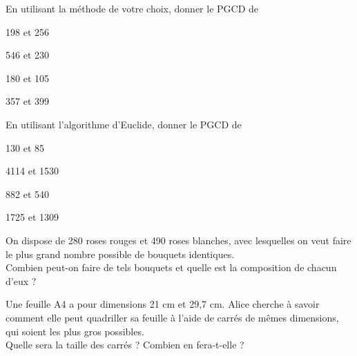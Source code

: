 \begin{exercice}[]
	
	En utilisant la méthode de votre choix, donner le \textsc{PGCD} de
	
	\begin{multicols}{2}
		\begin{enumalph}
			\item 198 et 256
			\item 546 et 230
			\item 180 et 105
			\item 357 et 399
		\end{enumalph}
	\end{multicols}
	
\end{exercice}



\begin{exercice}[]
	En utilisant l'algorithme d'Euclide, donner le \textsc{PGCD} de
	
	\begin{multicols}{2}
		\begin{enumalph}
			\item 130 et 85
			\item 4114 et 1530
			\item 882 et 540
			\item 1725 et 1309
		\end{enumalph}
	\end{multicols}
\end{exercice}

\begin{exercice}[]
	On dispose de 280 roses rouges et 490 roses blanches, avec lesquelles on veut faire le plus grand nombre possible de bouquets identiques.\\
	Combien peut-on faire de tels bouquets et quelle est la composition de chacun d'eux ?\\
	
\end{exercice}

\begin{exercice}

	Une feuille A4 a pour dimensions 21 cm et 29,7 cm. Alice cherche à savoir comment elle peut quadriller sa feuille à l'aide de carrés de mêmes
	dimensions, qui soient les plus gros possibles.\\
	Quelle sera la taille des carrés ? Combien en fera-t-elle ?
\end{exercice}



